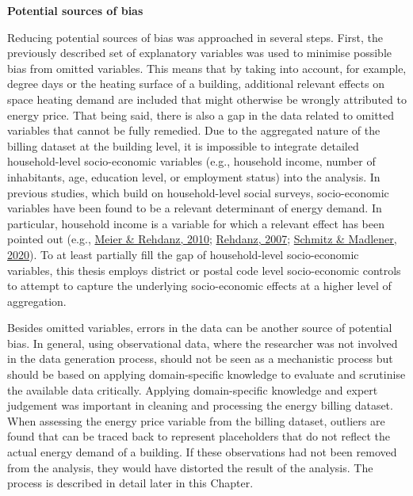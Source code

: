 \documentclass[12pt,twoside]{reedthesis}
\begin{document}
\textbf{Potential sources of bias}

Reducing potential sources of bias was approached in several steps. First, the previously described set of explanatory variables was used to minimise possible bias from omitted variables. This means that by taking into account, for example, degree days or the heating surface of a building, additional relevant effects on space heating demand are included that might otherwise be wrongly attributed to energy price. That being said, there is also a gap in the data related to omitted variables that cannot be fully remedied. Due to the aggregated nature of the billing dataset at the building level, it is impossible to integrate detailed household-level socio-economic variables (e.g., household income, number of inhabitants, age, education level, or employment status) into the analysis. In previous studies, which build on household-level social surveys, socio-economic variables have been found to be a relevant determinant of energy demand. In particular, household income is a variable for which a relevant effect has been pointed out (e.g., \protect\hyperlink{ref-meier_rehdanz10}{Meier \& Rehdanz, 2010}; \protect\hyperlink{ref-rehdanz07}{Rehdanz, 2007}; \protect\hyperlink{ref-schmitz_madlener20}{Schmitz \& Madlener, 2020}). To at least partially fill the gap of household-level socio-economic variables, this thesis employs district or postal code level socio-economic controls to attempt to capture the underlying socio-economic effects at a higher level of aggregation.

Besides omitted variables, errors in the data can be another source of potential bias. In general, using observational data, where the researcher was not involved in the data generation process, should not be seen as a mechanistic process but should be based on applying domain-specific knowledge to evaluate and scrutinise the available data critically. Applying domain-specific knowledge and expert judgement was important in cleaning and processing the energy billing dataset. When assessing the energy price variable from the billing dataset, outliers are found that can be traced back to represent placeholders that do not reflect the actual energy demand of a building. If these observations had not been removed from the analysis, they would have distorted the result of the analysis. The process is described in detail later in this Chapter.
\end{document}
